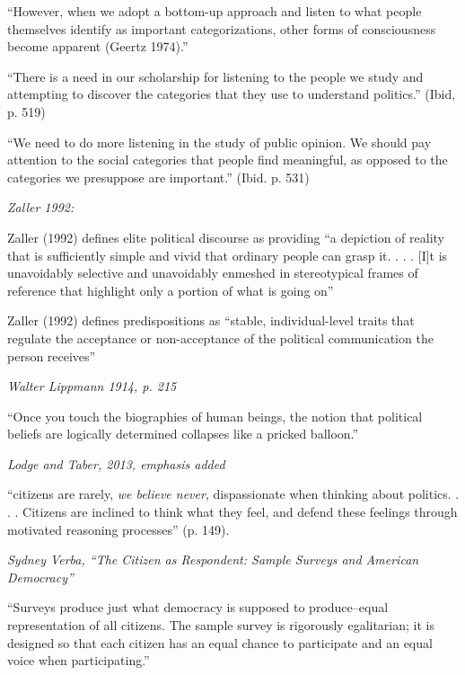 \documentclass[12pt]{article}
\begin{document}
``However, when we adopt a bottom-up approach and listen to what people themselves identify as important categorizations, other forms of consciousness become apparent (Geertz 1974).''

\hfill 

``There is a need in our scholarship for listening to the people we study and attempting to discover the categories that they use to understand politics.'' (Ibid, p. 519)

\hfill 

``We need to do more listening in the study of public opinion. We should pay attention to the social categories that people find meaningful, as opposed to the categories we presuppose are important.'' (Ibid. p. 531)

\hfill 

\textit{Zaller 1992:}

Zaller (1992) defines elite political discourse as providing ``a depiction of reality that is sufficiently simple and vivid that ordinary people can grasp it. . . . [I]t is unavoidably selective and unavoidably enmeshed in stereotypical frames of reference that highlight only a portion of what is going on''

\hfill 

Zaller (1992) defines predispositions as ``stable, individual-level traits that regulate the acceptance or non-acceptance of the political communication the person receives''

\hfill

\textit{Walter Lippmann 1914, p. 215}

``Once you touch the biographies of human beings, the notion that political beliefs are logically determined collapses like a pricked balloon.'' 

\hfill 

\textit{Lodge and Taber, 2013, emphasis added}

``citizens are rarely, \textit{we believe never}, dispassionate when thinking about politics. . . . Citizens are inclined to think what they feel, and defend these feelings through motivated reasoning processes'' (p. 149). 

\hfill 

\textit{Sydney Verba, ``The Citizen as Respondent: Sample Surveys and American Democracy''}

``Surveys produce just what democracy is supposed to produce--equal representation of all citizens. The sample survey is rigorously egalitarian; it is designed so that each citizen has an equal chance to participate and an equal voice when participating.''
\end{document}
